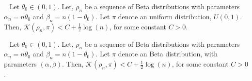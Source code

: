 \documentclass[10pt,a4paper]{amsart}
\begin{document}
\begin{lemma}~\label{prop:kl-prior-unif}
Let $\theta_0\in(0,1)$. Let, $\rho_n$ be a sequence of Beta distributions with parameters $\alpha_n=n\theta_0$ and $\beta_n=n(1-\theta_0)$. Let $\pi$ denote an uniform distribution, $U(0,1)$. Then, $\mathcal{K}(\rho_n,\pi)<C+\frac{1}{2}\log (n)$, for some constant $C>0$. 
\end{lemma}

\begin{proposition}~\label{lem:kl-prior}
Let $\theta_0\in(0,1)$. Let, $\rho_n$ be a sequence of Beta distributions with parameters $\alpha_n=n\theta_0$ and $\beta_n=n(1-\theta_0)$. Let $\pi$ denote an Beta distribution, with parameters $(\alpha,\beta)$. Then, $\mathcal{K}(\rho_n,\pi)<C+\frac{1}{2}\log(n)$, for some constant $C>0$. 
\end{proposition}
\end{document}
